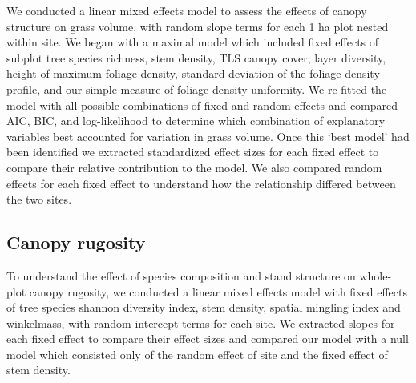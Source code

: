 \documentclass[11pt,a4paper]{article}
\begin{document}
We conducted a linear mixed effects model to assess the effects of canopy structure on grass volume, with random slope terms for each 1 ha plot nested within site. We began with a maximal model which included fixed effects of subplot tree species richness, stem density, TLS canopy cover, layer diversity, height of maximum foliage density, standard deviation of the foliage density profile, and our simple measure of foliage density uniformity. We re-fitted the model with all possible combinations of fixed and random effects and compared AIC, BIC, and log-likelihood to determine which combination of explanatory variables best accounted for variation in grass volume. Once this `best model' had been identified we extracted standardized effect sizes for each fixed effect to compare their relative contribution to the model. We also compared random effects for each fixed effect to understand how the relationship differed between the two sites.

\subsection{Canopy rugosity}

To understand the effect of species composition and stand structure on whole-plot canopy rugosity, we conducted a linear mixed effects model with fixed effects of tree species shannon diversity index, stem density, spatial mingling index and winkelmass, with random intercept terms for each site. We extracted slopes for each fixed effect to compare their effect sizes and compared our model with a null model which consisted only of the random effect of site and the fixed effect of stem density.

\printbibliography
\end{document}
